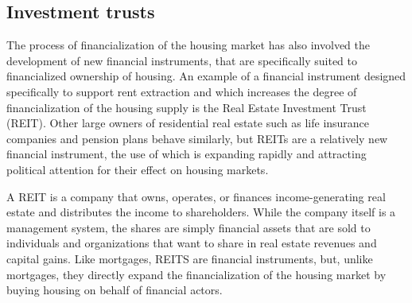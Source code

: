 

\subsection{Investment trusts}

The process of financialization of the housing market has also involved the development of new financial instruments, that are specifically suited to financialized ownership of housing. An example of a financial instrument designed specifically to support rent extraction and which increases the degree of financialization of the housing supply is the Real Estate Investment Trust (\gls{REIT}). Other large owners of residential real estate such as life insurance companies and pension plans behave similarly, but REITs are a relatively new financial instrument, the use of which is expanding rapidly and attracting political attention for their effect on housing markets.

A REIT is a company that owns, operates, or finances income-generating real estate and distributes the income to shareholders. While the company itself is a management system, the shares are simply financial assets that are sold to individuals and organizations that want to share in real estate revenues and capital gains. Like mortgages, REITS are financial instruments, but, unlike mortgages, they directly expand the financialization of the housing market by buying housing on behalf of financial actors.

